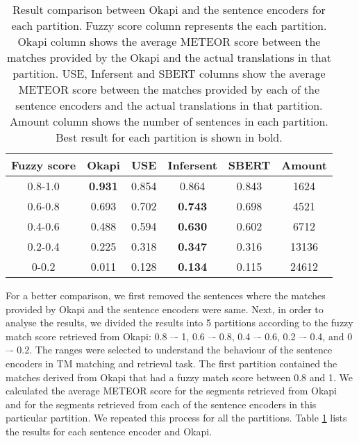 \begin{table}[ht!]
	\begin{center}
		\begin{tabular}{|c|c|c|c|c|c|}
			\hline
			\textbf{Fuzzy score} & \textbf{Okapi} & \textbf{USE} & \textbf{Infersent} & \textbf{SBERT} & \textbf{Amount} \\ 
			\hline
			0.8-1.0 & \textbf{0.931} & 0.854 & 0.864 & 0.843 &1624\\
			\hline
			0.6-0.8 & 0.693 & 0.702 & \textbf{0.743} & 0.698 & 4521\\
			\hline
			0.4-0.6 & 0.488 & 0.594 & \textbf{0.630} & 0.602 & 6712\\
			\hline
			0.2-0.4 & 0.225 & 0.318 & \textbf{0.347} & 0.316 & 13136 \\
			\hline
			0-0.2 & 0.011 & 0.128 & \textbf{0.134} & 0.115 & 24612 \\
			\hline
		\end{tabular}
		\caption[Result comparison between Okapi and the sentence encoders]{Result comparison between Okapi and the sentence encoders for each partition. Fuzzy score column represents the each partition. Okapi column shows the average METEOR score between the matches provided by the Okapi and the actual translations in that partition. USE, Infersent and SBERT columns show the average METEOR score between the matches provided by each of the sentence encoders and the actual translations in that partition. Amount column shows the number of sentences in each partition. Best result for each partition is shown in bold.}
		\label{tab:tm_sentence_encoder_results}
	\end{center}
\end{table}

For a better comparison, we first removed the sentences where the matches provided by Okapi and the sentence encoders were same. Next, in order to analyse the results, we divided the results into 5 partitions according to the fuzzy match score retrieved from Okapi: 0.8 –- 1, 0.6 –- 0.8, 0.4 –- 0.6, 0.2 –- 0.4, and 0 –- 0.2. The ranges were selected to understand the behaviour of the sentence encoders in TM matching and retrieval task. The first partition contained the matches derived from Okapi that had a fuzzy match score  between 0.8 and 1. We calculated the average METEOR score for the segments retrieved from Okapi and for the segments retrieved from each of the sentence encoders in this particular partition. We repeated this process for all the partitions. Table \ref{tab:tm_sentence_encoder_results} lists the results for each sentence encoder and Okapi. 

